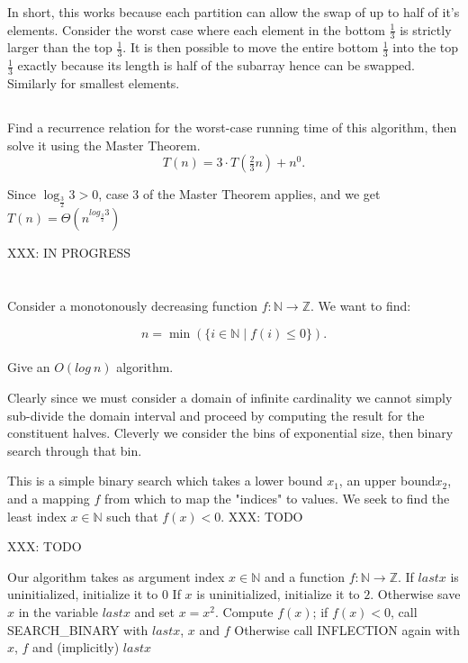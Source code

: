 \documentclass{amsart}
\theoremstyle{definition}
\theoremstyle{remark}
\numberwithin{equation}{section}
\newcommand{\NN}{\mathbb N}
\newcommand{\ZZ}{\mathbb Z}
\begin{document}
In short, this works because each partition can allow the swap of up to
half of it's elements. Consider the worst case where each element in the
bottom $\frac{1}{3}$ is strictly larger than the top $\frac{1}{3}$. It
is then possible to move the entire bottom $\frac{1}{3}$ into the top
$\frac{1}{3}$ exactly because its length is half of the subarray hence
can be swapped. Similarly for smallest elements.

\subsection{} Find a recurrence relation for the worst-case running time of this algorithm, then solve it using the Master Theorem.
$$ T(n) = 3 \cdot T( \tfrac{2}{3} n) + n^0. $$

Since $\log_{\frac{3}{2}} {3} > 0$, case 3 of the Master Theorem applies, and we get
$T(n) = \Theta ( n^{log_{\frac{3}{2}} {3}} )$

XXX: IN PROGRESS
\section{} Consider a monotonously decreasing function $f : \NN \rightarrow \ZZ$. We want to find:

$$ n = \min (\{i \in \NN \mid f(i) \leq 0 \}).$$ \\ 

Give an $O(log\ n)$ algorithm.

Clearly since we must consider a domain of infinite cardinality we cannot simply sub-divide the domain interval and proceed by computing the result for the constituent halves. Cleverly we consider the bins of exponential size, then binary search through that bin.


This is a simple binary search which takes a lower bound $x_1$, an upper bound$x_2$,
and a mapping $f$ from which to map the "indices" to values. We seek to find
the least index $x \in \NN$ such that $f(x) < 0$.
XXX: TODO

\proof
XXX: TODO


Our algorithm takes as argument index $x \in \NN$ and a function $f :
\NN \rightarrow \ZZ$. If $lastx$ is uninitialized, initialize it to $0$
If $x$ is uninitialized, initialize it to $2$. Otherwise save $x$ in the
variable $lastx$ and set $x = x^2$. Compute $f(x)$; if $f(x) < 0$, call
SEARCH\_BINARY with $lastx$, $x$ and $f$ Otherwise call INFLECTION again with
$x$, $f$ and (implicitly) $lastx$
\end{document}
